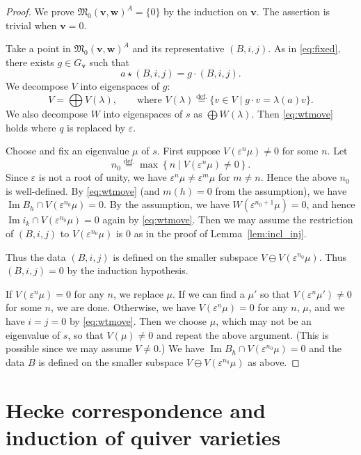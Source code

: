 \documentclass[12pt]{amsart}
\def\frak{\mathfrak}
\theoremstyle{definition}
\theoremstyle{remark}
\numberwithin{equation}{subsection}
\newcommand{\lemref}[1]{Lemma~\ref{#1}}
\newcommand{\defeq}{\overset{\operatorname{\scriptstyle def.}}{=}}
\newcommand{\Ima}{\operatorname{Im}}
\newcommand{\ve}{\varepsilon}
\newcommand{\M}{{\frak M}} %
\newcommand{\bv}{{\mathbf v}} %
\newcommand{\bw}{{\mathbf w}} %
\begin{document}
\begin{proof}
We prove $\M_0(\bv,\bw)^A = \{ 0\}$ by the induction on $\bv$. The
assertion is trivial when $\bv = 0$.

Take a point in $\M_0(\bv,\bw)^A$ and its representative $(B,i,j)$. As
in \eqref{eq:fixed}, there exists $g\in G_\bv$ such that
\begin{equation*}
   a \star (B,i,j) = g \cdot (B,i,j).
\end{equation*}
We decompose $V$ into eigenspaces of $g$:
\begin{equation*}
  V = \bigoplus V(\lambda), \qquad\text{where
  $V(\lambda) \defeq \{ v\in V\mid g\cdot v = \lambda(a)v \}$}.
\end{equation*}
We also decompose $W$ into eigenspaces of $s$ as $\bigoplus W(\lambda)$.
Then \eqref{eq:wtmove} holds where $q$ is replaced by $\ve$.

Choose and fix an eigenvalue $\mu$ of $s$. First suppose
$V(\ve^n\mu)\neq 0$ for some $n$. Let
\begin{equation*}
   n_0 \defeq \max\left\{ n \mid V(\ve^n\mu)\neq 0 \right\}.
\end{equation*}
Since $\varepsilon$ is not a root of unity, we have $\ve^n\mu\neq
\ve^m\mu$ for $m\neq n$. Hence the above $n_0$ is well-defined.
%
By \eqref{eq:wtmove} (and $m(h) = 0$ from the assumption),
we have $\Ima B_h \cap V(\ve^{n_0}\mu) = 0$.
By the assumption, we have $W(\ve^{n_0+1}\mu) = 0$, and hence
$\Ima i_k \cap V(\ve^{n_0}\mu) = 0$ again by \eqref{eq:wtmove}.
%
Then we may assume the restriction of $(B,i,j)$ to $V(\ve^{n_0}\mu)$
is $0$ as in the proof of \lemref{lem:incl_inj}.

Thus the data $(B,i,j)$ is defined on the smaller subspace
$V\ominus V(\ve^{n_0}\mu)$. Thus $(B,i,j) = 0$ by the induction
hypothesis.

If $V(\ve^n\mu) = 0$ for any $n$, we replace $\mu$. If we can find a
$\mu'$ so that $V(\ve^n\mu')\neq 0$ for some $n$, we are
done. Otherwise, we have $V(\ve^n\mu) = 0$ for any $n$, $\mu$, and we
have $i = j = 0$ by \eqref{eq:wtmove}.
%
Then we choose $\mu$, which may not be an eigenvalue of $s$, so that
$V(\mu) \neq 0$ and repeat the above argument. (This is possible since
we may assume $V\neq 0$.) We have $\Ima B_h \cap V(\ve^{n_0}\mu) = 0$
and the data $B$ is defined on the smaller subspace $V\ominus
V(\ve^{n_0}\mu)$ as above.
\end{proof}

\section{Hecke correspondence and induction of quiver varieties}
\end{document}
